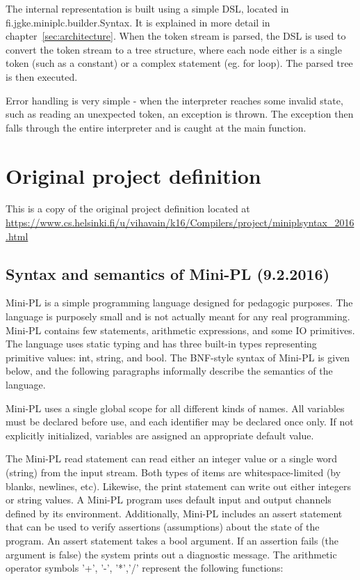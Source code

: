 \documentclass{article}
\begin{document}
The internal representation is built using a simple DSL, located in
fi.jgke.miniplc.builder.Syntax. It is explained in more detail in
chapter~\ref{sec:architecture}. When the token stream is parsed, the DSL is
used to convert the token stream to a tree structure, where each node either
is a single token (such as a constant) or a complex statement (eg. for loop).
The parsed tree is then executed.

Error handling is very simple - when the interpreter reaches some invalid
state, such as reading an unexpected token, an exception is thrown. The
exception then falls through the entire interpreter and is caught at the main
function.

\newpage
\appendix
\section{Original project definition}

This is a copy of the original project definition located at
\url{https://www.cs.helsinki.fi/u/vihavain/k16/Compilers/project/miniplsyntax\_2016.html}

\subsection{Syntax and semantics of Mini-PL (9.2.2016)}
Mini-PL is a simple programming language designed for pedagogic purposes. The
language is purposely small and is not actually meant for any real programming.
Mini-PL contains few statements, arithmetic expressions, and some IO
primitives. The language uses static typing and has three built-in types
representing primitive values: int, string, and bool. The BNF-style syntax of
Mini-PL is given below, and the following paragraphs informally describe the
semantics of the language.

Mini-PL uses a single global scope for all different kinds of names. All
variables must be declared before use, and each identifier may be declared once
only. If not explicitly initialized, variables are assigned an appropriate
default value.

The Mini-PL read statement can read either an integer value or a single word
(string) from the input stream. Both types of items are whitespace-limited (by
blanks, newlines, etc). Likewise, the print statement can write out either
integers or string values. A Mini-PL program uses default input and output
channels defined by its environment. Additionally, Mini-PL includes an assert
statement that can be used to verify assertions (assumptions) about the state
of the program. An assert statement takes a bool argument. If an assertion
fails (the argument is false) the system prints out a diagnostic message.  The
arithmetic operator symbols '+', '-', '*','/' represent the following
functions:
\end{document}
